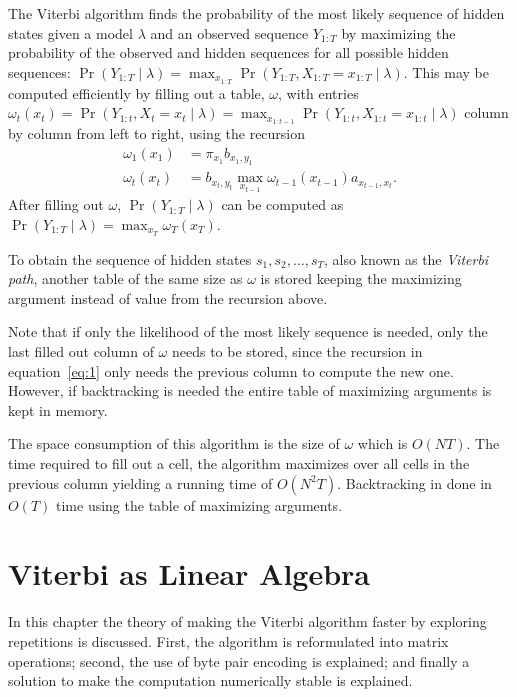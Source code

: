 The Viterbi algorithm finds the probability of the most likely sequence of
hidden states given a model $\lambda$ and an observed sequence $Y_{1:T}$ by
maximizing the probability of the observed and hidden sequences for all
possible hidden sequences: $\Pr(Y_{1:T} \mid \lambda) = \max_{x_{1:T}}
\Pr(Y_{1:T}, X_{1:T} = x_{1:T} \mid \lambda)$. This may be computed efficiently
by filling out a table, $\omega$, with entries $\omega_t(x_t) = \Pr(Y_{1:t},
X_t = x_t \mid \lambda) = \max_{x_{1:t-1}} \Pr(Y_{1:t}, X_{1:t} = x_{1:t} \mid
\lambda)$ column by column from left to right, using the recursion
\begin{equation}
  \label{eq:1}
  \begin{aligned}
    \omega_1(x_1) &= \pi_{x_1} b_{x_1, y_1} \\
    \omega_t(x_t) &= b_{x_t, y_t} \max_{x_{t - 1}} \omega_{t - 1}(x_{t - 1})
    a_{x_{t - 1}, x_t}.
  \end{aligned}
\end{equation}
After filling out $\omega$, $\Pr(Y_{1:T} \mid \lambda)$ can be computed as
$\Pr(Y_{1:T} \mid \lambda) = \max_{x_T} \omega_T(x_T)$.

To obtain the sequence of hidden states $s_1, s_2, \dots, s_T$, also known as
the \emph{Viterbi path}, another table of the same size as $\omega$ is stored
keeping the maximizing argument instead of value from the recursion
above. 

Note that if only the likelihood of the most likely sequence is needed, only
the last filled out column of $\omega$ needs to be stored, since the recursion
in equation~\eqref{eq:1} only needs the previous column to compute the new
one. However, if backtracking is needed the entire table of maximizing
arguments is kept in memory. 

The space consumption of this algorithm is the size of $\omega$ which is $O(N
T)$. The time required to fill out a cell, the algorithm maximizes over all
cells in the previous column yielding a running time of $O(N^2
T)$. Backtracking in done in $O(T)$ time using the table of maximizing
arguments.

\section{Viterbi as Linear Algebra}
\label{sec:algorithm-as-linear}

In this chapter the theory of making the Viterbi algorithm faster by exploring
repetitions is discussed. First, the algorithm is reformulated into matrix
operations; second, the use of byte pair encoding is explained; and finally
a solution to make the computation numerically stable is explained.

